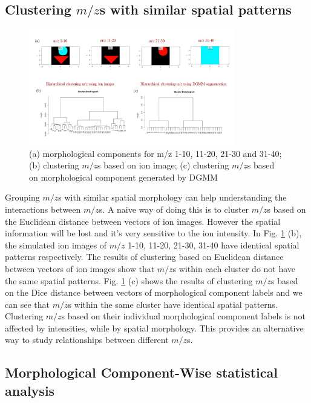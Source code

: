 \documentclass{bioinfo}
\begin{document}
\subsection{Clustering $m/z$s with similar spatial patterns}


\begin{figure}[b!]
    
	\includegraphics[width=0.8\textwidth]{figure7.jpg}
    \caption{(a) morphological components for m/z 1-10, 11-20, 21-30 and 31-40; (b) clustering $m/z$s based on ion image; (c) clustering $m/z$s based on morphological component  generated by DGMM}
    \label{fig:figure7}
\end{figure}

Grouping $m/z$s with similar spatial morphology can help understanding the interactions between $m/z$s.  A naive way of doing this is to cluster $m/z$s based on the Euclidean distance between vectors of ion images. However the spatial information will be lost and it's very sensitive to the ion intensity. In Fig. \ref{fig:figure7} (b), the simulated ion images of $m/z$ 1-10, 11-20, 21-30, 31-40 have identical spatial patterns respectively. The results of clustering based on Euclidean distance between vectors of ion images show that $m/z$s within each cluster do not have the same spatial patterns. Fig. \ref{fig:figure7} (c) shows the results of clustering $m/z$s based on the Dice distance between vectors of morphological component labels and we can see that $m/z$s within the same cluster have identical spatial patterns. Clustering $m/z$s based on their individual morphological component labels is not affected by intensities, while by spatial morphology. This provides an alternative way to study relationships between different $m/z$s.

\subsection{Morphological Component-Wise statistical analysis}
\end{document}
